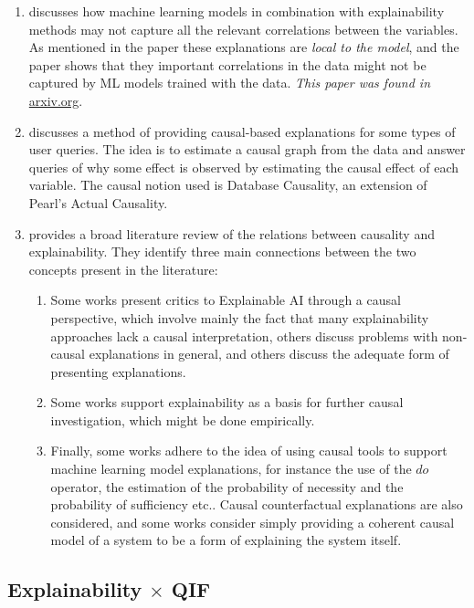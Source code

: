 \begin{enumerate}
\item \cite{Trying to Outrun Causality in Machine Learning: Limitations of Model Explainability Techniques for Identifying Predictive Variables} discusses how machine learning models in combination with explainability methods may not capture all the relevant correlations between the variables. As mentioned in the paper these explanations are \emph{local to the model}, and the paper shows that they important correlations in the data might not be captured by ML models trained with the data. \emph{This paper was found in }\url{arxiv.org}.
\item \cite{XInsight: eXplainable Data Analysis Through The Lens of Causality} discusses a method of providing causal-based explanations for some types of user queries. The idea is to estimate a causal graph from the data and answer queries of why some effect is observed by estimating the causal effect of each variable. The causal notion used is Database Causality, an extension of Pearl's Actual Causality.
\item \cite{The role of causality in explainable artificial intelligence} provides a broad literature review of the relations between causality and explainability. They identify three main connections between the two concepts present in the literature: \begin{enumerate}
    \item Some works present critics to Explainable AI through a causal perspective, which involve mainly the fact that many explainability approaches lack a causal interpretation, others discuss problems with non-causal explanations in general, and others discuss the adequate form of presenting explanations.
    \item Some works support explainability as a basis for further causal investigation, which might be done empirically.
    \item Finally, some works adhere to the idea of using causal tools to support machine learning model explanations, for instance the use of the $do$ operator, the estimation of the probability of necessity and the probability of sufficiency etc.. Causal counterfactual explanations are also considered, and some works consider simply providing a coherent causal model of a system to be a form of explaining the system itself.
    \end{enumerate}
\end{enumerate}

\subsection{Explainability $\times$ QIF}

